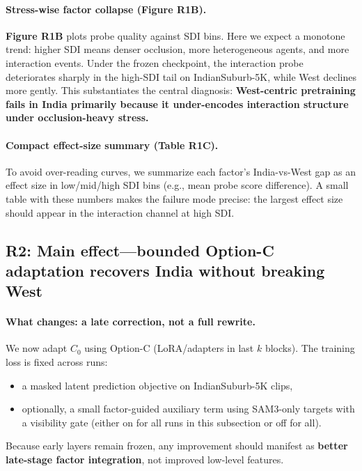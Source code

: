 \vspace{4pt}
\paragraph{Stress-wise factor collapse (Figure R1B).}
\textbf{Figure R1B} plots probe quality against SDI bins. Here we expect a monotone trend: higher SDI means denser occlusion, more heterogeneous agents, and more interaction events. Under the frozen checkpoint, the interaction probe deteriorates sharply in the high-SDI tail on IndianSuburb-5K, while West declines more gently. This substantiates the central diagnosis: \textbf{West-centric pretraining fails in India primarily because it under-encodes interaction structure under occlusion-heavy stress.}

\vspace{4pt}
\paragraph{Compact effect-size summary (Table R1C).}
To avoid over-reading curves, we summarize each factor’s India-vs-West gap as an effect size in low/mid/high SDI bins (e.g., mean probe score difference). A small table with these numbers makes the failure mode precise: the largest effect size should appear in the interaction channel at high SDI.

\subsection{R2: Main effect---bounded Option-C adaptation recovers India without breaking West}
\label{sec:r2_main_effect}

\paragraph{What changes: a late correction, not a full rewrite.}
We now adapt $C_0$ using Option-C (LoRA/adapters in last $k$ blocks). The training loss is fixed across runs:
\begin{itemize}[leftmargin=*,itemsep=2pt]
\item a masked latent prediction objective on IndianSuburb-5K clips,
\item optionally, a small factor-guided auxiliary term using SAM3-only targets with a visibility gate (either on for all runs in this subsection or off for all).
\end{itemize}
Because early layers remain frozen, any improvement should manifest as \textbf{better late-stage factor integration}, not improved low-level features.

